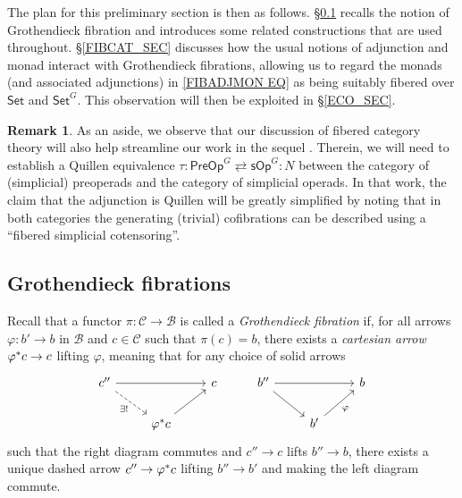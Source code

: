 \documentclass[a4paper,10pt
,draft
]{article}%
\numberwithin{equation}{section}
\numberwithin{figure}{section}
\theoremstyle{definition} %
\newtheorem{remark}[equation]{Remark}%
\newcommand{\1}{\ensuremath{\mathbbm 1}}%
\begin{document}
The plan for this preliminary section is then as follows.
%
\S \ref{GROTFIB SEC} recalls the notion of Grothendieck fibration and
introduces some related constructions that are used throughout.
%
\S \ref{FIBCAT_SEC} discusses how the usual notions of adjunction and monad interact with Grothendieck fibrations,
allowing us to regard the monads
(and associated adjunctions)
in \eqref{FIBADJMON EQ}
as being suitably fibered over $\mathsf{Set}$ and $\mathsf{Set}^G$.
%
This observation will then be exploited in \S \ref{ECO_SEC}. 

\begin{remark}
        As an aside,
        we observe that our discussion of fibered category theory will
        also help streamline our work in the sequel \cite{BP_TAS}.
        Therein, we will need to establish a Quillen equivalence
        $\tau \colon \mathsf{PreOp}^G \rightleftarrows \mathsf{sOp}^G\colon N$
        between the category of (simplicial) preoperads and
        the category of simplicial operads.
        In that work, the claim that the adjunction is Quillen 
        will be greatly simplified by noting that in both categories 
        the generating (trivial) cofibrations
        can be described using a ``fibered simplicial cotensoring''.
\end{remark}



\subsection{Grothendieck fibrations}\label{GROTFIB SEC}


Recall that a functor 
$\pi \colon \mathcal{C} \to \mathcal{B}$
is called a \emph{Grothendieck fibration} if,
for all arrows
$\varphi \colon b' \to b$ in $\mathcal{B}$
and $c \in \mathcal{C}$ such that $\pi(c) = b$,
there exists a \emph{cartesian arrow}
$\varphi^{\**}c \to c$
lifting $\varphi$,
meaning that for any choice of solid arrows
\begin{equation}\label{CARTARDEF EQ}
\begin{tikzcd}
c'' \ar{rr} \ar[dashed]{rd}[swap]{\exists!} 
&&
c
&%
b'' \ar{rr} \ar{rd} 
&&
b
\\
& \varphi^{\**} c \ar{ru}
&
&%
& b'\ar{ru}[swap]{\varphi}
&
\end{tikzcd}
\end{equation}
such that the right diagram commutes and 
$c'' \to c$ lifts $b'' \to b$,
there exists a unique dashed arrow
$c'' \to \varphi^{\**} c$ lifting $b'' \to b'$
and making the left diagram commute.
\end{document}
